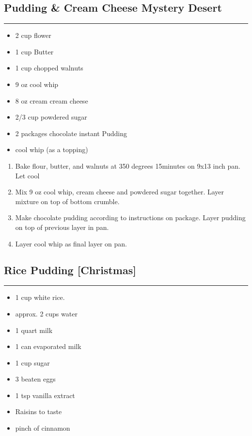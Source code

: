\documentclass{article}
\begin{document}
\subsection{Pudding \& Cream Cheese Mystery Desert} 
\noindent\rule[0.5ex]{\linewidth}{1pt}

\begin{framed}
    \begin{itemize}
        \item 2 cup flower 
        \item 1 cup Butter
        \item 1 cup chopped walnuts
        \item 9 oz cool whip
        \item 8 oz cream cream cheese 
        \item 2/3 cup powdered sugar
        \item 2 packages chocolate instant Pudding
        \item cool whip (as a topping)
    \end{itemize}
\end{framed}

\begin{enumerate}
    \item 
        Bake flour, butter, and walnuts at 350 degrees 15minutes on 9x13 inch pan. Let cool
    \item 
        Mix 9 oz cool whip, cream cheese and powdered sugar together. Layer mixture on top of bottom crumble.
    \item 
        Make chocolate pudding according to instructions on package. Layer pudding on top of previous layer in pan.
    \item 
        Layer cool whip as final layer on pan. 
\end{enumerate}
\newpage

\subsection{Rice Pudding [Christmas]} 
\noindent\rule[0.5ex]{\linewidth}{1pt}

\begin{framed}
    \begin{itemize}
        \item 1 cup white rice.
        \item approx. 2 cups water
        \item 1 quart milk 
        \item 1 can evaporated milk 
        \item 1 cup sugar 
        \item 3 beaten eggs 
        \item 1 tsp vanilla extract
        \item Raisins to taste
        \item pinch of cinnamon
    \end{itemize}
\end{framed}
\end{document}
